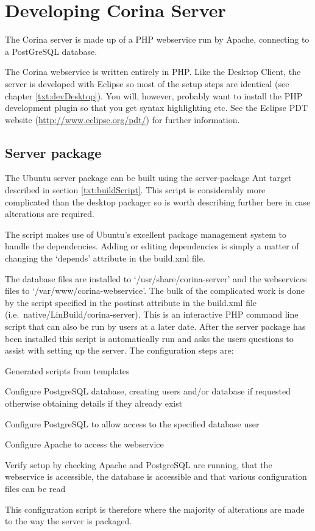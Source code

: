 \chapter{Developing Corina Server}

The Corina server is made up of a PHP webservice run by Apache, connecting to a PostGreSQL database.  

The Corina webservice is written entirely in PHP.  Like the Desktop Client, the server is developed with Eclipse so most of the setup steps are identical (see chapter \ref{txt:devDesktop}).  You will, however, probably want to install the PHP development plugin so that you get syntax highlighting etc.  See the Eclipse PDT website (\url{http://www.eclipse.org/pdt/}) for further information.


\section{Server package}
\label{txt:serverPackage}
The Ubuntu server package can be built using the server-package Ant target described in section \ref{txt:buildScript}.  This script is considerably more complicated than the desktop packager so is worth describing further here in case alterations are required.

The script makes use of Ubuntu's excellent package management system to handle the dependencies.  Adding or editing dependencies is simply a matter of changing the `depends' attribute in the build.xml file.  

The database files are installed to `/usr/share/corina-server' and the webservices files to `/var/www/corina-webservice'.  The bulk of the complicated work is done by the script specified in the postinst attribute in the build.xml file (i.e.\ native/LinBuild/corina-server).  This is an interactive PHP command line script that can also be run by users at a later date.  After the server package has been installed this script is automatically run and asks the users questions to assist with setting up the server.  The configuration steps are:

\begin{itemize*}
 \item Generated scripts from templates
 \item Configure PostgreSQL database, creating users and/or database if requested otherwise obtaining details if they already exist
 \item Configure PostgreSQL to allow access to the specified database user
 \item Configure Apache to access the webservice
 \item Verify setup by checking Apache and PostgreSQL are running, that the webservice is accessible, the database is accessible and that various configuration files can be read
\end{itemize*}

This configuration script is therefore where the majority of alterations are made to the way the server is packaged.  

